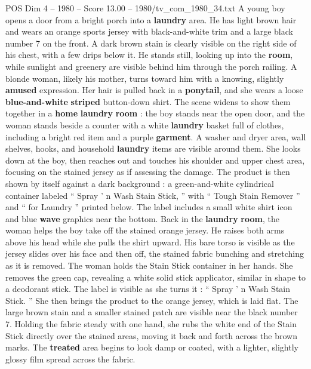 \begin{textsample}{POS Dim 4 – 1980 – Score 13.00 – 1980/tv\_com\_1980\_34.txt}  \label{ex:f4_pos_050}
A young boy opens a door from a bright porch into a \textbf{laundry} area.
He has light brown hair and wears an orange sports jersey with black-and-white trim and a large black number 7 on the front.
A dark brown stain is clearly visible on the right side of his chest, with a few drips below it.
He stands still, looking up into the \textbf{room}, while sunlight and greenery are visible behind him through the porch railing.
A blonde woman, likely his mother, turns toward him with a knowing, slightly \textbf{amused} expression.
Her hair is pulled back in a \textbf{ponytail}, and she wears a loose \textbf{blue-and-white} \textbf{striped} button-down shirt.
The scene widens to show them together in a \textbf{home} \textbf{laundry} \textbf{room} : the boy stands near the open door, and the woman stands beside a counter with a white \textbf{laundry} basket full of clothes, including a bright red item and a purple \textbf{garment}.
A washer and dryer area, wall shelves, hooks, and household \textbf{laundry} items are visible around them.
She looks down at the boy, then reaches out and touches his shoulder and upper chest area, focusing on the stained jersey as if assessing the damage.
The product is then shown by itself against a dark background : a green-and-white cylindrical container labeled “ Spray ’ n Wash Stain Stick, ” with “ Tough Stain Remover ” and “ for Laundry ” printed below.
The label includes a small white shirt icon and blue \textbf{wave} graphics near the bottom.
Back in the \textbf{laundry} \textbf{room}, the woman helps the boy take off the stained orange jersey.
He raises both arms above his head while she pulls the shirt upward.
His bare torso is visible as the jersey slides over his face and then off, the stained fabric bunching and stretching as it is removed.
The woman holds the Stain Stick container in her hands.
She removes the green cap, revealing a white solid stick applicator, similar in shape to a deodorant stick.
The label is visible as she turns it : “ Spray ’ n Wash Stain Stick. ” She then brings the product to the orange jersey, which is laid flat.
The large brown stain and a smaller stained patch are visible near the black number 7.
Holding the fabric steady with one hand, she rubs the white end of the Stain Stick directly over the stained areas, moving it back and forth across the brown marks.
The \textbf{treated} area begins to look damp or coated, with a lighter, slightly glossy film spread across the fabric.

\end{textsample}
